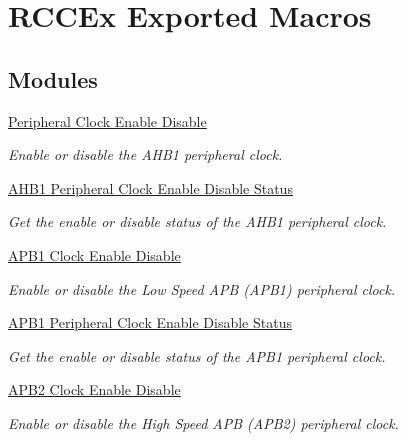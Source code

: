 \hypertarget{group___r_c_c_ex___exported___macros}{}\section{R\+C\+C\+Ex Exported Macros}
\label{group___r_c_c_ex___exported___macros}
\subsection*{Modules}
\begin{DoxyCompactItemize}
\item 
\hyperlink{group___r_c_c_ex___peripheral___clock___enable___disable}{Peripheral Clock Enable Disable}
\begin{DoxyCompactList}\small\item\em Enable or disable the A\+H\+B1 peripheral clock. \end{DoxyCompactList}\item 
\hyperlink{group___r_c_c_ex___a_h_b1___peripheral___clock___enable___disable___status}{A\+H\+B1 Peripheral Clock Enable Disable Status}
\begin{DoxyCompactList}\small\item\em Get the enable or disable status of the A\+H\+B1 peripheral clock. \end{DoxyCompactList}\item 
\hyperlink{group___r_c_c_ex___a_p_b1___clock___enable___disable}{A\+P\+B1 Clock Enable Disable}
\begin{DoxyCompactList}\small\item\em Enable or disable the Low Speed A\+PB (A\+P\+B1) peripheral clock. \end{DoxyCompactList}\item 
\hyperlink{group___r_c_c_ex___a_p_b1___peripheral___clock___enable___disable___status}{A\+P\+B1 Peripheral Clock Enable Disable Status}
\begin{DoxyCompactList}\small\item\em Get the enable or disable status of the A\+P\+B1 peripheral clock. \end{DoxyCompactList}\item 
\hyperlink{group___r_c_c_ex___a_p_b2___clock___enable___disable}{A\+P\+B2 Clock Enable Disable}
\begin{DoxyCompactList}\small\item\em Enable or disable the High Speed A\+PB (A\+P\+B2) peripheral clock. \end{DoxyCompactList}\item 

\end{DoxyCompactItemize}
